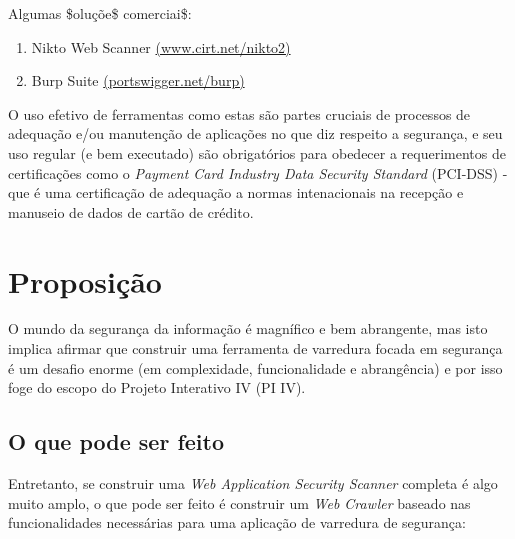 \documentclass[a4paper]{article}
\begin{document}
Algumas \$oluçõe\$ comerciai\$:

\begin{enumerate}
\item Nikto Web Scanner \href{http://www.cirt.net/nikto2}{(www.cirt.net/nikto2)}
\item Burp Suite \href{http://portswigger.net/burp/}{(portswigger.net/burp)}
\end{enumerate}

O uso efetivo de ferramentas como estas são partes cruciais de processos de adequação e/ou manutenção de aplicações no que diz respeito a segurança, e seu uso regular (e bem executado) são obrigatórios para obedecer a requerimentos de certificações como o \emph{Payment Card Industry Data Security Standard} (PCI-DSS) - que é uma certificação de adequação a normas intenacionais na recepção e manuseio de dados de cartão de crédito.

\section{Proposição}

O mundo da segurança da informação é magnífico e bem abrangente, mas isto implica afirmar que construir uma ferramenta de varredura focada em segurança é um desafio enorme (em complexidade, funcionalidade e abrangência) e por isso foge do escopo do Projeto Interativo IV (PI IV).

\subsection{O que pode ser feito}

Entretanto, se construir uma \emph{Web Application Security Scanner} completa é algo muito amplo, o que pode ser feito é construir um \emph{Web Crawler} baseado nas funcionalidades necessárias para uma aplicação de varredura de segurança:
 
\end{document}
